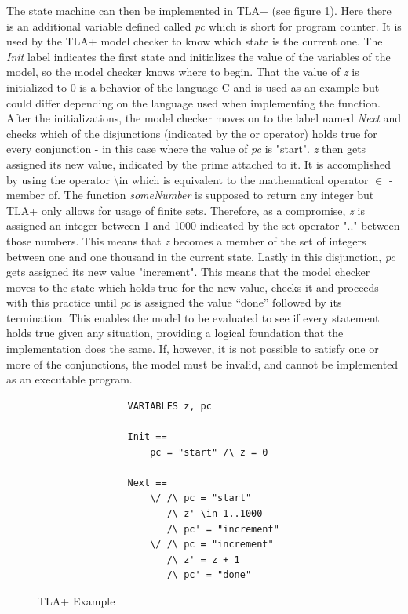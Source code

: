 The state machine can then be implemented in TLA+ (see figure \ref{fig:tlaexample}). Here there is an additional variable defined called \textit{pc} which is short for program counter. It is used by the TLA+ model checker to know which state is the current one. The \textit{Init} label indicates the first state and initializes the value of the variables of the model, so the model checker knows where to begin. That the value of \textit{z} is initialized to 0 is a behavior of the language C and is used as an example but could differ depending on the language used when implementing the function. After the initializations, the model checker moves on to the label named \textit{Next} and checks which of the disjunctions (indicated by the or operator) holds true for every conjunction - in this case where the value of \textit{pc} is "start". \textit{z} then gets assigned its new value, indicated by the prime attached to it. It is accomplished by using the operator \textbackslash in which is equivalent to the mathematical operator $\in$ - member of. The function \textit{someNumber} is supposed to return any integer but TLA+ only allows for usage of finite sets. Therefore, as a compromise, \textit{z} is assigned an integer between 1 and 1000 indicated by the set operator ".." between those numbers. This means that \textit{z} becomes a member of the set of integers between one and one thousand in the current state. Lastly in this disjunction, \textit{pc} gets assigned its new value "increment". This means that the model checker moves to the state which holds true for the new value, checks it and proceeds with this practice until \textit{pc} is assigned the value “done” followed by its termination. This enables the model to be evaluated to see if every statement holds true given any situation, providing a logical foundation that the implementation does the same. If, however, it is not possible to satisfy one or more of the conjunctions, the model must be invalid, and cannot be implemented as an executable program.


\begin{figure}[H]
 \vspace{5pt}
\begin{lstlisting}
                VARIABLES z, pc

                Init == 
                    pc = "start" /\ z = 0
    
                Next == 
                    \/ /\ pc = "start"
                       /\ z' \in 1..1000
                       /\ pc' = "increment"
                    \/ /\ pc = "increment"
                       /\ z' = z + 1
                       /\ pc' = "done"
\end{lstlisting}
\caption{TLA+ Example}
\label{fig:tlaexample}
\end{figure}

